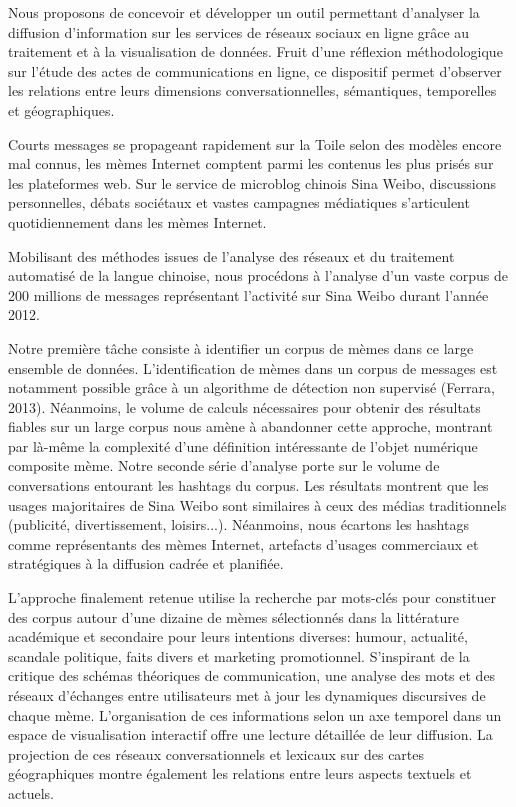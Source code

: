 
Nous proposons de concevoir et développer un outil permettant d’analyser la diffusion d’information sur les services de réseaux sociaux en ligne grâce au traitement et à la visualisation de données. Fruit d’une réflexion méthodologique sur l’étude des actes de communications en ligne, ce dispositif permet d’observer les relations entre leurs dimensions conversationnelles, sémantiques, temporelles et géographiques.

Courts messages se propageant rapidement sur la Toile selon des modèles encore mal connus, les mèmes Internet comptent parmi les contenus les plus prisés sur les plateformes web. Sur le service de microblog chinois Sina Weibo, discussions personnelles, débats sociétaux et vastes campagnes médiatiques s’articulent quotidiennement dans les mèmes Internet.

Mobilisant des méthodes issues de l’analyse des réseaux et du traitement automatisé de la langue chinoise, nous procédons à l’analyse d’un vaste corpus de 200 millions de messages représentant l’activité sur Sina Weibo durant l’année 2012. 

Notre première tâche consiste à identifier un corpus de mèmes dans ce large ensemble de données. L’identification de mèmes dans un corpus de messages est notamment possible grâce à un algorithme de détection non supervisé (Ferrara, 2013). Néanmoins, le volume de calculs nécessaires pour obtenir des résultats fiables sur un large corpus nous amène à abandonner cette approche, montrant par là-même la complexité d’une définition intéressante de l’objet numérique composite mème. Notre seconde série d’analyse porte sur le volume de conversations entourant les hashtags du corpus. Les résultats montrent que les usages majoritaires de Sina Weibo sont similaires à ceux des médias traditionnels (publicité, divertissement, loisirs...). Néanmoins, nous écartons les hashtags comme représentants des mèmes Internet, artefacts d’usages commerciaux et stratégiques à la diffusion cadrée et planifiée. 

L’approche finalement retenue utilise la recherche par mots-clés pour constituer des corpus autour d’une dizaine de mèmes sélectionnés dans la littérature académique et secondaire pour leurs intentions diverses: humour, actualité, scandale politique, faits divers et marketing promotionnel. S’inspirant de la critique des schémas théoriques de communication, une analyse des mots et des réseaux d’échanges entre utilisateurs met à jour les dynamiques discursives de chaque mème. L’organisation de ces informations selon un axe temporel dans un espace de visualisation interactif offre une lecture détaillée de leur diffusion. La projection de ces réseaux conversationnels et lexicaux sur des cartes géographiques montre également les relations entre leurs aspects textuels et actuels.

